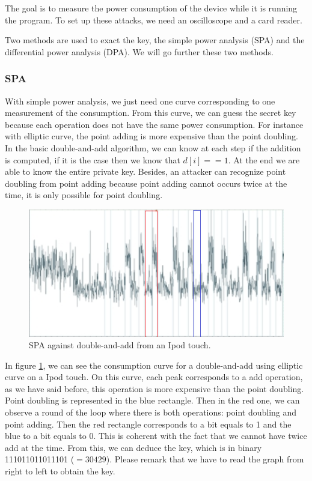 \documentclass[journal]{IEEEtran}
\begin{document}
The goal is to measure the power consumption of the device while it is running the program. To set up these attacks, we need an oscilloscope and a card reader.

Two methods are used to exact the key, the simple power analysis (SPA) and the differential power analysis (DPA). We will go further these two methods.

        \subsubsection{SPA}

With simple power analysis, we just need one curve corresponding to one measurement of the consumption. From this curve, we can guess the secret key because each operation does not have the same power consumption. For instance with elliptic curve, the point adding is more expensive than the point doubling. In the basic double-and-add algorithm, we can know at each step if the addition is computed, if it is the case then we know that $ d[i]==1 $. At the end we are able to know the entire private key. Besides, an attacker can recognize point doubling from point adding because point adding cannot occurs twice at the time, it is only possible for point doubling.\\


\begin{figure}[h]
   \includegraphics[scale=0.65]{spa.png}
   \caption{\label{spa.png} SPA against double-and-add from an Ipod touch.}
\end{figure}

In figure \ref{spa.png}, we can see the consumption curve for a double-and-add using elliptic curve on a Ipod touch. On this curve, each peak corresponds to a add operation, as we have said before, this operation is more expensive than the point doubling. Point doubling is represented in the blue rectangle. Then in the red one, we can observe a round of the loop where there is both operations: point doubling and point adding. Then the red rectangle corresponds to a bit equals to 1 and the blue to a bit equals to 0. This is coherent with the fact that we cannot have twice add at the time. From this, we can deduce the key, which is in binary 111011011011101 ($=30429$). Please remark that we have to read the graph from right to left to obtain the key.\\
\end{document}
